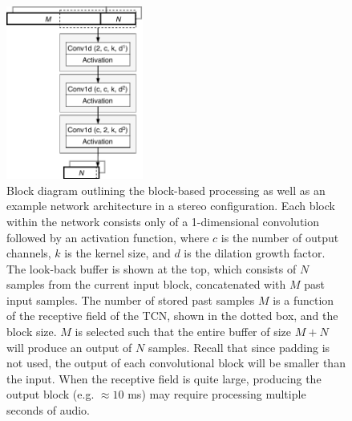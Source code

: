 \documentclass{article}
\begin{document}
\begin{figure}[htb!]
  \centering
  \includegraphics[width=0.4\textwidth]{plugin-diagram-v2.pdf}  
  \caption{Block diagram outlining the block-based processing as well as an example network architecture in a stereo configuration. 
  Each block within the network consists only of a 1-dimensional convolution followed by an activation function,
  where $c$ is the number of output channels, $k$ is the kernel size, and $d$ is the dilation growth factor.
  The look-back buffer is shown at the top, which consists of $N$ samples from the current input block, 
  concatenated with $M$ past input samples. The number of stored past samples $M$ is a function 
  of the receptive field of the TCN, shown in the dotted box, and the block size. 
  $M$ is selected such that the entire buffer of size $M+N$ will produce an output of $N$ samples.
  Recall that since padding is not used, the output of each convolutional block will be smaller than the input. 
  When the receptive field is quite large, producing the output block (e.g. $\approx 10$ ms)
   may require processing multiple seconds of audio.}
  \label{fig:diagram}
\end{figure} 

%    
\end{document}
